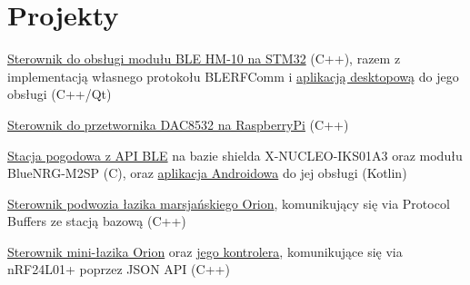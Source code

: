 \documentclass[a4paper]{comcv}
\begin{document}
\vspace{\topsep}


\vspace{\topsep}

\section{Projekty}

\vspace{\topsep}
\vspace{\topsep}
\vspace{\topsep}

\begin{tightlist}
    \item \href{https://github.com/SteelPh0enix/STM32_HM10_Driver}{Sterownik do obsługi modułu BLE HM-10 na STM32} (C++), razem z implementacją własnego protokołu BLERFComm i \href{https://github.com/SteelPh0enix/BLERFCommClient}{aplikacją desktopową} do jego obsługi (C++/Qt)
    \item \href{https://github.com/SteelPh0enix/DAC8532}{Sterownik do przetwornika DAC8532 na RaspberryPi} (C++)
    \item \href{https://github.com/SteelPh0enix/BLEWeatherStation}{Stacja pogodowa z API BLE} na bazie shielda X-NUCLEO-IKS01A3 oraz modułu BlueNRG-M2SP (C), oraz \href{https://github.com/SteelPh0enix/WeatherStationAndroidApp}{aplikacja Androidowa} do jej obsługi (Kotlin)
    \item \href{https://github.com/SteelPh0enix/OrionChassisDriverV3}{Sterownik podwozia łazika marsjańskiego Orion}, komunikujący się via Protocol Buffers ze stacją bazową (C++)
    \item \href{https://github.com/SteelPh0enix/Orion-Mini-Rover}{Sterownik mini-łazika Orion} oraz \href{https://github.com/SteelPh0enix/Orion-Mini-Rover}{jego kontrolera}, komunikujące się via nRF24L01+ poprzez JSON API (C++)
\end{tightlist}
\end{document}
